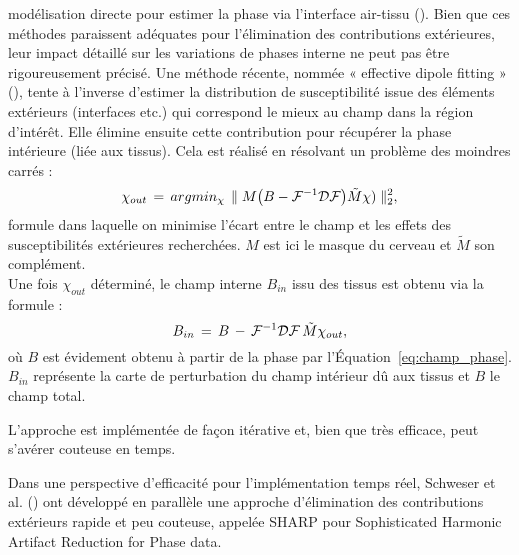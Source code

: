 {modélisation directe pour estimer la phase via l’interface air-tissu (\cite{Neelavalli2009}). Bien que ces méthodes
paraissent adéquates pour l’élimination des contributions extérieures, leur impact détaillé sur les
variations de phases interne ne peut pas être rigoureusement précisé. Une méthode récente, nommée
« effective dipole fitting » (\cite{Liu2011b}), tente à l’inverse d’estimer la distribution de susceptibilité issue des
éléments extérieurs (interfaces etc.) qui correspond le mieux au champ dans la région d’intérêt. Elle
élimine ensuite cette contribution pour récupérer la phase intérieure (liée aux tissus). Cela est réalisé
en résolvant un problème des moindres carrés :
\begin{equation}
\chi_{out}\,=\,argmin_{\chi}\,\parallel M\bigl(B-{\cal F}^{-1}{\cal D}{\cal F}\bigr)\tilde{M}\chi)\parallel_2^2,
\end{equation}
formule dans laquelle on minimise l’écart entre le champ et les effets des susceptibilités extérieures recherchées. $M$ est ici le masque du cerveau et $\tilde{M}$ son complément.\\
Une fois $\chi_{out}$ déterminé, le champ interne $B_{in}$ issu des tissus est obtenu via la formule :
\begin{equation}
B_{in}\,=\,B\,-\,{\cal F}^{-1}{\cal D}{\cal F}\,\tilde{M}\chi_{out},
\end{equation}
où $B$ est évidement obtenu à partir de la phase par l’Équation~\ref{eq:champ_phase}. $B_{in}$ représente la carte de
perturbation du champ intérieur dû aux tissus et $B$ le champ total.

L’approche est implémentée de façon itérative et, bien que très efficace, peut s’avérer couteuse en
temps.

Dans une perspective d’efficacité pour l’implémentation temps réel, Schweser et al. (\cite{Schweser2011}) ont
développé en parallèle une approche d’élimination des contributions extérieurs rapide et peu
couteuse, appelée SHARP pour Sophisticated Harmonic Artifact Reduction for Phase data.

}
